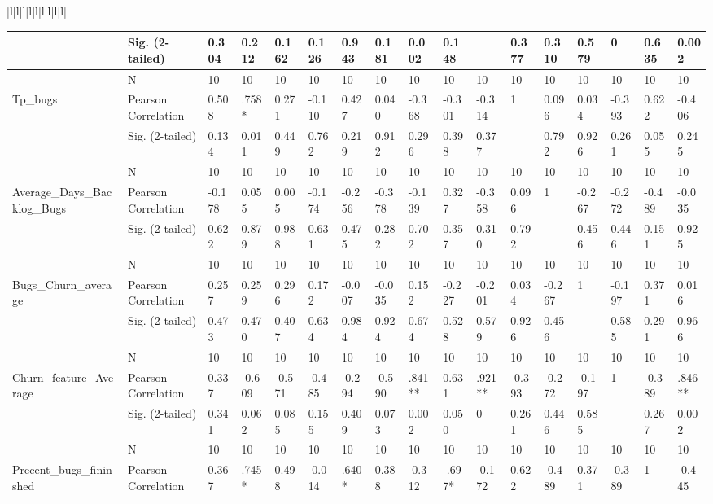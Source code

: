 \documentclass[UKenglish]{ifimaster}  %
\begin{document}
\begin{table}[!htbp]
\begin{adjustwidth}{-2.5cm}{}
{\begin{tabular}{|l|l|l|l|l|l|l|l|l|}
\begin{tabular}{ | l | l | l | l | l | l | l | l | l | l | l | l | l | l | l | l | l | }
	 & Sig. (2-tailed) & 0.304 & 0.212 & 0.162 & 0.126 & 0.943 & 0.181 & 0.002 & 0.148 &  & 0.377 & 0.310 & 0.579 & 0 & 0.635 & 0.002\\ \hline
	 & N & 10 & 10 & 10 & 10 & 10 & 10 & 10 & 10 & 10 & 10 & 10 & 10 & 10 & 10 & 10 \\ \hline
	Tp\_bugs & Pearson Correlation & 0.508 & .758* & 0.271 & -0.110 & 0.427 & 0.040 & -0.368 & -0.301 & -0.314 & 1 & 0.096 & 0.034 & -0.393 & 0.622 & -0.406\\ \hline
	 & Sig. (2-tailed) & 0.134 & 0.011 & 0.449 & 0.762 & 0.219 & 0.912 & 0.296 & 0.398 & 0.377 &  & 0.792 & 0.926 & 0.261 & 0.055 & 0.245\\ \hline
	 & N & 10 & 10 & 10 & 10 & 10 & 10 & 10 & 10 & 10 & 10 & 10 & 10 & 10 & 10 & 10 \\ \hline
	Average\_Days\_Backlog\_Bugs & Pearson Correlation & -0.178 & 0.055 & 0.005 & -0.174 & -0.256 & -0.378 & -0.139 & 0.327 & -0.358 & 0.096 & 1 & -0.267 & -0.272 & -0.489 & -0.035\\ \hline
	 & Sig. (2-tailed) & 0.622 & 0.879 & 0.988 & 0.631 & 0.475 & 0.282 & 0.702 & 0.357 & 0.310 & 0.792 &  & 0.456 & 0.446 & 0.151 & 0.925\\ \hline
	 & N & 10 & 10 & 10 & 10 & 10 & 10 & 10 & 10 & 10 & 10 & 10 & 10 & 10 & 10 & 10 \\ \hline
	Bugs\_Churn\_average & Pearson Correlation & 0.257 & 0.259 & 0.296 & 0.172 & -0.007 & -0.035 & 0.152 & -0.227 & -0.201 & 0.034 & -0.267 & 1 & -0.197 & 0.371 & 0.016\\ \hline
	 & Sig. (2-tailed) & 0.473 & 0.470 & 0.407 & 0.634 & 0.984 & 0.924 & 0.674 & 0.528 & 0.579 & 0.926 & 0.456 &  & 0.585 & 0.291 & 0.966\\ \hline
	 & N & 10 & 10 & 10 & 10 & 10 & 10 & 10 & 10 & 10 & 10 & 10 & 10 & 10 & 10 & 10 \\ \hline
	Churn\_feature\_Average & Pearson Correlation & 0.337 & -0.609 & -0.571 & -0.485 & -0.294 & -0.590 & .841** & 0.631 & .921** & -0.393 & -0.272 & -0.197 & 1 & -0.389 & .846** \\ \hline
	 & Sig. (2-tailed) & 0.341 & 0.062 & 0.085 & 0.155 & 0.409 & 0.073 & 0.002 & 0.050 & 0 & 0.261 & 0.446 & 0.585 &  & 0.267 & 0.002\\ \hline
	 & N & 10 & 10 & 10 & 10 & 10 & 10 & 10 & 10 & 10 & 10 & 10 & 10 & 10 & 10 & 10 \\ \hline
	Precent\_bugs\_fininshed & Pearson Correlation & 0.367 & .745* & 0.498 & -0.014 & .640* & 0.388 & -0.312 & -.697* & -0.172 & 0.622 & -0.489 & 0.371 & -0.389 & 1 & -0.445\\ \hline

\end{tabular}
\end{tabular}}
\end{adjustwidth}
\end{table}
\end{document}
